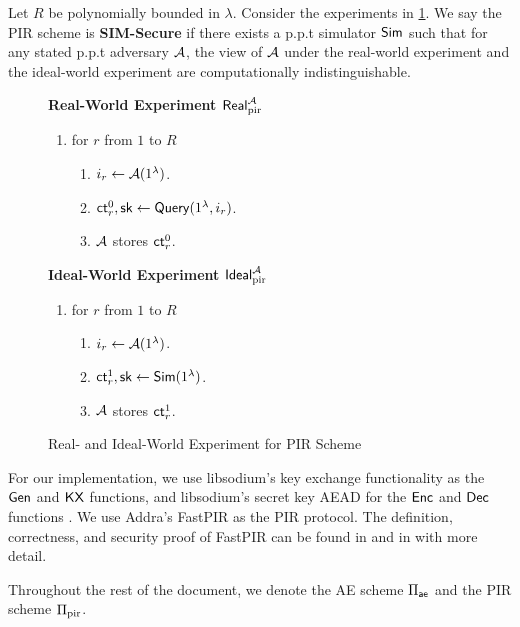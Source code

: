 \begin{definition}
\label{defn:PIR-SIM-security}
Let $R$ be polynomially bounded in $\lambda$. Consider the experiments in \cref{expr:pir-real-ideal-world}. We say the PIR scheme is \textbf{SIM-Secure} if there exists a p.p.t simulator $\mathsf{Sim}$ such that for any stated p.p.t adversary $\mathcal{A}$, the view of $\mathcal{A}$ under the real-world experiment and the ideal-world experiment are computationally indistinguishable. 

\begin{figure}[ht!]
\begin{framed}
\textbf{Real-World Experiment $\mathsf{Real}^{\mathcal{A}}_{\text{pir}}$}
\begin{enumerate}
    \item for $r$ from $1$ to $R$
    \begin{enumerate}
        \item $i_r \leftarrow \mathcal{A}(1^{\lambda})$.
        \item $\mathsf{ct}_r^0, {\mathsf{sk}} \leftarrow \mathsf{Query}(1^{\lambda}, i_r)$.
        \item $\mathcal{A}$ stores $\mathsf{ct}_r^0$.
    \end{enumerate}
\end{enumerate}
\textbf{Ideal-World Experiment $\mathsf{Ideal}^{\mathcal{A}}_{\text{pir}}$}
\begin{enumerate}
    \item for $r$ from $1$ to $R$
    \begin{enumerate}
        \item $i_r \leftarrow \mathcal{A}(1^{\lambda})$.
        \item $\mathsf{ct}_r^1, {\mathsf{sk}} \leftarrow \mathsf{Sim}(1^{\lambda})$.
        \item $\mathcal{A}$ stores $\mathsf{ct}_r^1$.
    \end{enumerate}
\end{enumerate}
\end{framed}
\caption{Real- and Ideal-World Experiment for PIR Scheme}
\label{expr:pir-real-ideal-world}
\end{figure}
\end{definition}
For our implementation, we use libsodium's key exchange functionality as the $\mathsf{Gen}$ and $\mathsf{KX}$ functions, and libsodium's secret key AEAD for the $\mathsf{Enc}$ and $\mathsf{Dec}$ functions \cite{libsodium}. We use Addra's FastPIR as the PIR protocol. The definition, correctness, and security proof of FastPIR can be found in \cite[Section 4]{ahmad2021addra} and in \cite{angel2018thesis} with more detail.

Throughout the rest of the document, we denote the AE scheme $\Pi_{\mathsf{ae}}$ and the PIR scheme $\Pi_{\text{pir}}$.

